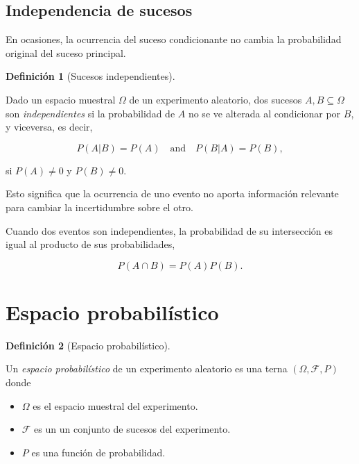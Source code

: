 \documentclass[
  spanish,
  a4paper,
]{scrreport}
\providecommand{\tightlist}{%
  \setlength{\itemsep}{0pt}\setlength{\parskip}{0pt}}
\theoremstyle{plain}
\theoremstyle{definition}
\theoremstyle{definition}
\newtheorem{definition}{Definición}[chapter]
\theoremstyle{remark}
\begin{document}
\subsection{Independencia de sucesos}\label{independencia-de-sucesos}

En ocasiones, la ocurrencia del suceso condicionante no cambia la
probabilidad original del suceso principal.

\begin{definition}[Sucesos
independientes]\protect\hypertarget{def-sucesos-independientes}{}\label{def-sucesos-independientes}

Dado un espacio muestral \(\Omega\) de un experimento aleatorio, dos
sucesos \(A,B\subseteq \Omega\) son \emph{independientes} si la
probabilidad de \(A\) no se ve alterada al condicionar por \(B\), y
viceversa, es decir,

\[P(A|B) = P(A) \quad \mbox{and} \quad P(B|A)=P(B),\]

si \(P(A)\neq 0\) y \(P(B)\neq 0\).

\end{definition}

Esto significa que la ocurrencia de uno evento no aporta información
relevante para cambiar la incertidumbre sobre el otro.

Cuando dos eventos son independientes, la probabilidad de su
intersección es igual al producto de sus probabilidades,

\[P(A\cap B) = P(A)P(B).\]

\section{Espacio probabilístico}\label{espacio-probabiluxedstico}

\begin{definition}[Espacio
probabilístico]\protect\hypertarget{def-espacio-probabilistico}{}\label{def-espacio-probabilistico}

Un \emph{espacio probabilístico} de un experimento aleatorio es una
terna \((\Omega,\mathcal{F},P)\) donde

\begin{itemize}
\tightlist
\item
  \(\Omega\) es el espacio muestral del experimento.
\item
  \(\mathcal{F}\) es un un conjunto de sucesos del experimento.
\item
  \(P\) es una función de probabilidad.
\end{itemize}

\end{definition}
\end{document}
